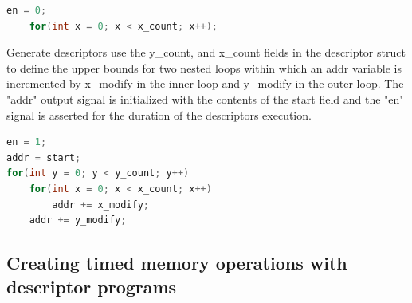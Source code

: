 \begin{lstlisting}[language=C, caption=Descriptor as a set of loops, label={lst:descriptor:wait}]
    en = 0;
    for(int x = 0; x < x_count; x++);
\end{lstlisting}

Generate descriptors use the y\_count, and x\_count fields in the descriptor struct
to define the upper bounds for two nested loops within which an addr
variable is incremented by x\_modify in the inner loop and y\_modify in the
outer loop. The "addr" output signal is initialized with the contents of the
start field and the "en" signal is asserted for the duration of the descriptors
execution.

\begin{lstlisting}[language=C, caption=Descriptor as a set of loops, label={lst:descriptor:generator}]
en = 1;
addr = start;
for(int y = 0; y < y_count; y++)
    for(int x = 0; x < x_count; x++)
        addr += x_modify;
    addr += y_modify;
\end{lstlisting}



\subsection{Creating timed memory operations with descriptor programs}
\label{chap:sams:memory_transactions}


